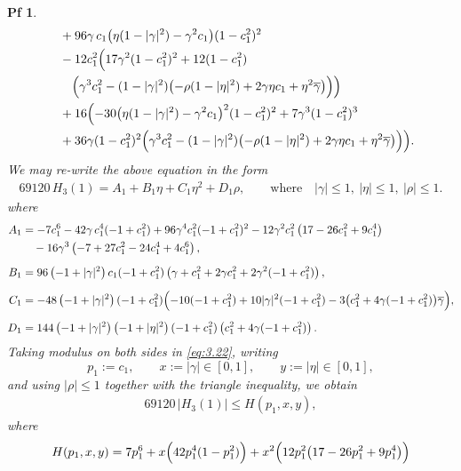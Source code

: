 \documentclass[10pt,a4paper]{amsart}
\newtheorem{pf}{Pf}
\begin{document}
\begin{pf}
\begin{align}
&
\quad+96\gamma\,c_{1}\bigl(\eta(1-|\gamma|^{2})-\gamma^{2}c_{1}\bigr)(1-c_{1}^{2})^{2} \notag\\
&\quad
-12c_{1}^{2}\Bigl(
17\gamma^{2}(1-c_{1}^{2})^{2}
+12(1-c_{1}^{2})\notag\\
&\qquad
\Bigl(\gamma^{3}c_{1}^{2}
-(1-|\gamma|^{2})\bigl(-\rho(1-|\eta|^{2})+2\gamma\eta c_{1}+\eta^{2}\overline{\gamma}\bigr)\Bigr)
\Bigr) \notag\\
&\quad
+16\Bigl(
-30\bigl(\eta(1-|\gamma|^{2})-\gamma^{2}c_{1}\bigr)^{2}(1-c_{1}^{2})^{2}
+7\gamma^{3}(1-c_{1}^{2})^{3} \notag\\
&\quad
+36\gamma(1-c_{1}^{2})^{2}\Bigl(\gamma^{3}c_{1}^{2}
-(1-|\gamma|^{2})\bigl(-\rho(1-|\eta|^{2})+2\gamma\eta c_{1}+\eta^{2}\overline{\gamma}\bigr)\Bigr)
\Bigr).
\end{align}
We may re-write the above equation in the form
\begin{align}\label{eq:3.22}
69120\,  H_3(1)=A_{1}+B_{1} \eta+C_{1} \eta^2+D_{1} \rho,
\qquad  \mbox{where} \quad |\gamma|\le 1,\ |\eta|\le 1,\ |\rho|\le 1.
\end{align}
where
\begin{align*}
A_{1}&=-7c_{1}^{6}-42\gamma\,c_{1}^{4}(-1+c_{1}^{2})
+96\gamma^{4}c_{1}^{2}(-1+c_{1}^{2})^{2}
-12\gamma^{2}c_{1}^{2}\left(17-26c_{1}^{2}+9c_{1}^{4}\right)\\
&\quad-16\gamma^{3}\left(-7+27c_{1}^{2}-24c_{1}^{4}+4c_{1}^{6}\right),\\[2mm]
B_{1}&=96\left(-1+|\gamma|^{2}\right)c_{1}(-1+c_{1}^{2})
\left(\gamma+c_{1}^{2}+2\gamma c_{1}^{2}+2\gamma^{2}(-1+c_{1}^{2})\right),\\[2mm]
C_{1}&=-48\left(-1+|\gamma|^{2}\right)(-1+c_{1}^{2})
\Bigl(-10(-1+c_{1}^{2})+10|\gamma|^{2}(-1+c_{1}^{2})
-3\bigl(c_{1}^{2}+4\gamma(-1+c_{1}^{2})\bigr)\overline{\gamma}\Bigr),\\[2mm]
D_{1}&=144\left(-1+|\gamma|^{2}\right)\left(-1+|\eta|^{2}\right)(-1+c_{1}^{2})
\left(c_{1}^{2}+4\gamma(-1+c_{1}^{2})\right).
\end{align*}
Taking modulus on both sides in \eqref{eq:3.22}, writing
\[
p_1:=c_1,\qquad x:=|\gamma|\in[0,1],\qquad y:=|\eta|\in[0,1],
\]
and using $|\rho|\le 1$ together with the triangle inequality, we obtain
\begin{align*}
69120\, |H_{3}(1)| \leq H(p_1, x, y),
\end{align*}
where
\begin{align}\label{eq:3.23}
H(p_1,x,y)
&= 7p_1^{6}
+ x\Bigl(42p_1^{4}(1-p_1^{2})\Bigr)
+ x^{2}\Bigl(12p_1^{2}\bigl(17-26p_1^{2}+9p_1^{4}\bigr)\Bigr)\notag\\

\end{align}
\end{pf}
\end{document}

